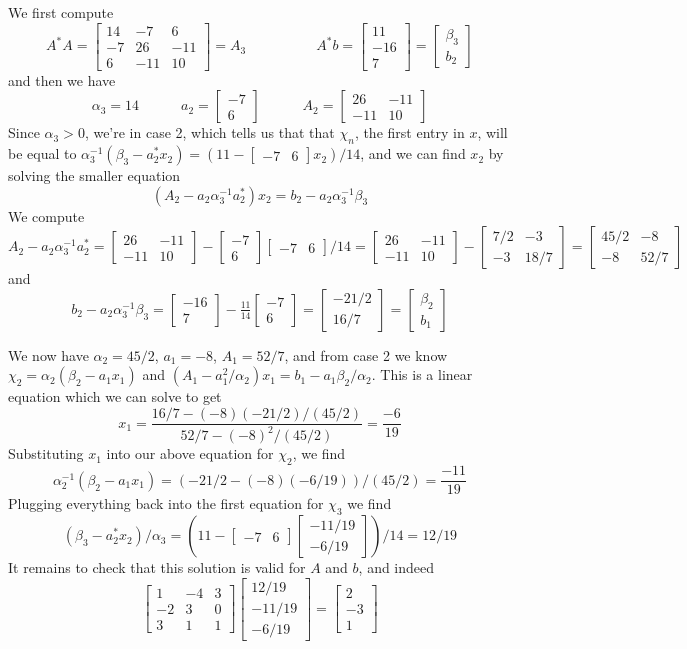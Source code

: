 \documentclass{article}
\newcommand{\bmat}[1]{\begin{bmatrix}#1\end{bmatrix}}
\begin{document}
We first compute
$$A^*A = \bmat{14 & -7 & 6\\ -7 & 26 & -11\\6 & -11 & 10} = A_3 \hspace{5em} A^*b =
\bmat{11\\ -16\\ 7} = \bmat{\beta_3\\b_2}$$
and then we have
$$\alpha_3 = 14 \hspace{3em} a_2 = \bmat{-7\\6} \hspace{3em} A_2 = \bmat{26 &
  -11\\-11 & 10}$$
Since $\alpha_3 > 0$, we're in case 2, which tells us that that $\chi_n$, the
first entry in $x$, will be equal to $\alpha_3^{-1}(\beta_3 - a^*_2x_2) = (11 -
\bmat{-7 & 6}x_2)/14$, and we can find $x_2$ by solving the smaller equation
$$ (A_2 - a_2\alpha_3^{-1}a_2^*)x_2 = b_2 - a_2\alpha_3^{-1}\beta_3$$
We compute
$$ A_2 - a_2\alpha_3^{-1} a_2^* = \bmat{26 & -11\\-11 & 10} - \bmat{-7 \\
  6}\bmat{-7&6}/14 = \bmat{26 & -11\\-11 & 10} - \bmat{7/2 & -3\\-3 & 18/7} =
\bmat{45/2 & -8\\-8 & 52/7}$$
and
$$ b_2 - a_2\alpha_3^{-1}\beta_3 = \bmat{-16\\7} - \tfrac{11}{14}\bmat{-7\\6} =
\bmat{-21/2\\ 16/7} = \bmat{\beta_2\\b_1} $$

We now have $\alpha_2 = 45/2$, $a_1 = -8$, $A_1 = 52/7$, and from case 2
we know $\chi_2 = \alpha_2(\beta_2 - a_1x_1)$ and $(A_1 - a_1^2/\alpha_2)x_1
= b_1 - a_1\beta_2/\alpha_2$. This is a linear equation which we can solve to
get
$$ x_1 = \frac{16/7 - (-8)(-21/2)/(45/2)}{52/7 - (-8)^2/(45/2)} =
\frac{-6}{19} $$
Substituting $x_1$ into our above equation for $\chi_2$, we find
$$ \alpha_2^{-1}(\beta_2 - a_1x_1) = (-21/2 - (-8)(-6/19))/(45/2) = \frac{-11}{19} $$
Plugging everything back into the first equation for $\chi_3$ we find
$$(\beta_3 - a_2^*x_2)/\alpha_3 = (11 - \bmat{-7 & 6}\bmat{-11/19\\-6/19})/14
= 12/19$$
It remains to check that this solution is valid for $A$ and $b$, and indeed
$$ \bmat{1 & -4 & 3\\-2 & 3 & 0\\3 & 1 & 1}\bmat{12/19\\-11/19\\-6/19} =
\bmat{2\\ -3 \\ 1}  $$
\end{document}
